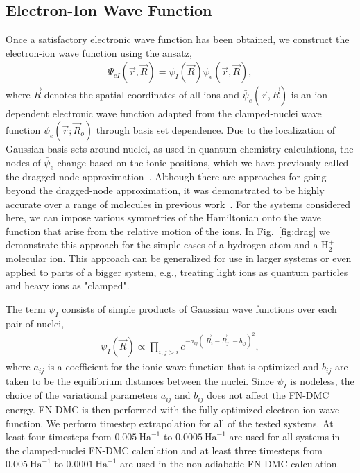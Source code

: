 \documentclass[pra,superscriptaddress,groupedaddress,twocolumn]{revtex4-1}
\begin{document}
\subsection{Electron-Ion Wave Function}

Once a satisfactory electronic wave function has been obtained, we construct the electron-ion wave function using the ansatz,
\begin{align}
\Psi_{eI}(\vec{r},\vec{R})=\psi_I(\vec{R})\bar{\psi}_e(\vec{r},\vec{R}), \label{eq:psi}
\end{align}
where $\vec{R}$ denotes the spatial coordinates of all ions and $\bar{\psi}_e(\vec{r},\vec{R})$ is an ion-dependent electronic wave function adapted from the clamped-nuclei wave function $\psi_e(\vec{r};\vec{R}_o)$ through basis set dependence. Due to the localization of Gaussian basis sets around nuclei, as used in quantum chemistry calculations, the nodes of $\bar{\psi}_e$ change based on the ionic positions, which we have previously called the dragged-node approximation~\cite{Tubman_ECG}. 
Although there are approaches for going beyond the dragged-node approximation, it was demonstrated to be highly accurate over a range of molecules in previous work~\cite{Tubman_ECG}. For the systems considered here, we can impose various symmetries of the Hamiltonian onto the wave function that arise from the relative motion of the ions. In Fig.~\ref{fig:drag} we demonstrate this approach for the simple cases of a hydrogen atom and a H$_2^+$ molecular ion. This approach can be generalized for use in larger systems or even applied to parts of a bigger system, e.g., treating light ions as quantum particles and heavy ions as "clamped".

The term $\psi_I$ consists of simple products of Gaussian wave functions over each pair of nuclei,
\begin{align}
\psi_I(\vec{R})\propto \prod\limits_{i,j>i}e^{-a_{ij}(\vert \vec{R}_i-\vec{R}_j\vert-b_{ij})^2},
\label{wfs_ions}
\end{align}
where $a_{ij}$ is a coefficient for the ionic wave function that is optimized and $b_{ij}$ are taken to be the equilibrium distances between the nuclei. Since $\psi_I$ is nodeless, the choice of the variational parameters $a_{ij}$ and $b_{ij}$ does not affect the FN-DMC energy. FN-DMC is then performed with the fully optimized electron-ion wave function. We perform timestep extrapolation for all of the tested systems. At least four timesteps from $0.005~\text{Ha}^{-1}$ to $0.0005~\text{Ha}^{-1}$ are used for all systems in the clamped-nuclei FN-DMC calculation and at least three timesteps from $0.005~\text{Ha}^{-1}$ to $0.0001~\text{Ha}^{-1}$ are used in the non-adiabatic FN-DMC calculation.
\end{document}
